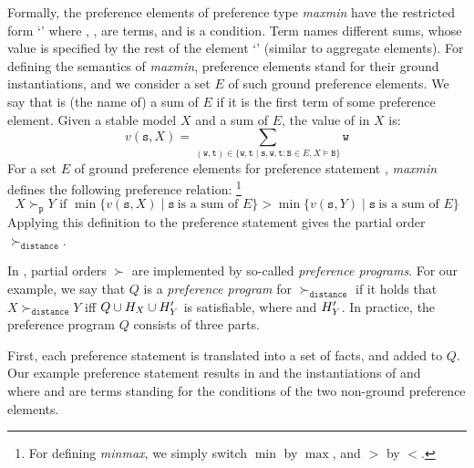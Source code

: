 Formally, the preference elements of preference type \textit{maxmin} have the restricted form
`'
where , ,  are terms, and  is a condition.
%
Term  names different sums,
whose value is specified by the rest of the element `'
(similar to aggregate elements).
%
For defining the semantics of \textit{maxmin}, 
preference elements stand for their ground instantiations, 
and we consider a set $E$ of such ground preference elements.
%
We say that  is (the name of) a sum of $E$ if it is the first term of some preference element.
Given a stable model $X$ and a sum  of $E$, the value of  in $X$ is:
\[\textstyle
v(\mathtt{s},X)=\sum_{(\mathtt{w},\mathtt{t})\in\{\mathtt{w},\mathtt{t}\mid \mathtt{s,w,t:B}\in E, X\models \mathtt{B}\}}\mathtt{w}
\]
For a set $E$ of ground preference elements for preference statement , 
\textit{maxmin} defines the following preference relation:%
\footnote{For defining \textit{minmax}, we simply switch $\min$ by $\max$, and $>$ by $<$.}
\[
X \succ_\mathtt{p} Y \text{ if } \min \{ v(\mathtt{s},X) \mid \mathtt{s} \ \text{is a sum of } E \} > \min \{ v(\mathtt{s},Y) \mid \mathtt{s} \ \text{is a sum of } E \} 
\]
Applying this definition to the preference statement  gives the partial order $\succ_\mathtt{distance}$.

%
In \asprin, partial orders $\succ$ are implemented by so-called \emph{preference programs}. 
%
For our example, we say that $Q$ is a \emph{preference program} for $\succ_\mathtt{distance}$ if it holds that
$X \succ_\mathtt{distance} Y$ iff $Q \cup {H}_{X} \cup {H}_{Y}'$ is satisfiable, 
where 
and   ${H}_{Y}'$.
%
In practice, the preference program $Q$ consists of three parts.

First, %
each preference statement is translated into a set of facts, and added to $Q$.
Our example preference statement  results in
and the instantiations of 
and 
 \\ 
where  and  are terms 
standing for the conditions of the two non-ground preference elements.

